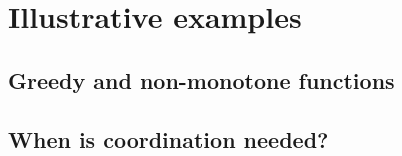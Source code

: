 \section{Illustrative examples}

\subsection{Greedy and non-monotone functions}\label{app:greedyfail}


\subsection{When is coordination needed?}

